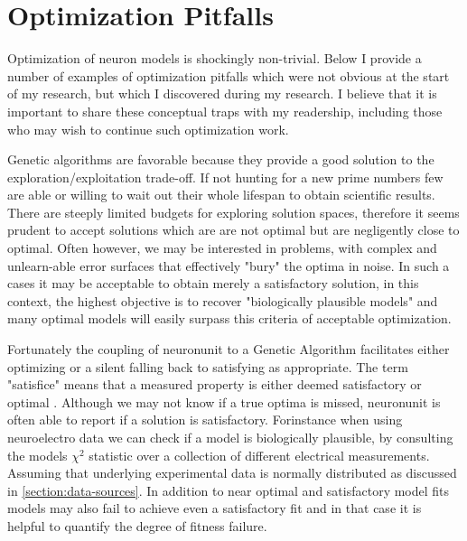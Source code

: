 \section{Optimization Pitfalls}
Optimization of neuron models is shockingly non-trivial.
Below I provide a number of examples of optimization pitfalls which were not obvious at the start of my research, but which I discovered during my research.
I believe that it is important to share these conceptual traps with my readership, including those who may wish to continue such optimization work.

Genetic algorithms are favorable because they provide a good solution to the exploration/exploitation trade-off. If not hunting for a new prime numbers few are able or willing to wait out their whole lifespan to obtain scientific results. There are steeply limited budgets for exploring solution spaces, therefore it seems prudent to accept solutions which are are not optimal but are negligently close to optimal. Often however, we may be interested in problems, with complex and unlearn-able error surfaces that effectively "bury" the optima in noise. In such a cases it may be acceptable to obtain merely a satisfactory solution, in this context, the highest objective is to recover "biologically plausible models" and many optimal models will easily surpass this criteria of acceptable optimization.

Fortunately the coupling of neuronunit to a Genetic Algorithm facilitates either optimizing or a silent falling back to satisfying as appropriate. The term "satisfice" means that a measured property is either deemed satisfactory or optimal \cite{simon1956rational}. Although we may not know if a true optima is missed, neuronunit is often able to report if a solution is satisfactory. Forinstance when using neuroelectro data we can check if a model is biologically plausible, by consulting the models $\chi^{2}$ statistic over a collection of different electrical measurements.  Assuming that underlying experimental data is normally distributed as discussed in \ref{section:data-sources}. In addition to near optimal and satisfactory model fits models may also fail to achieve even a satisfactory fit and in that case it is helpful to quantify the degree of fitness failure.


